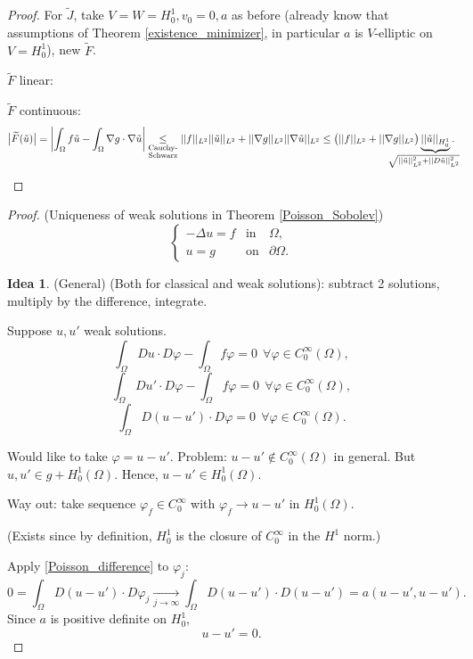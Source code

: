 \documentclass[12pt]{article}
\theoremstyle{definition}
\newtheorem*{idea}{Idea}
\begin{document}
\begin{proof}
For $\widetilde{J}$, take $V=W=H_0^1,v_0=0,a$ as before (already know that assumptions of Theorem \ref{existence_minimizer}, in particular $a$ is $V$-elliptic on $V=H_0^1$), new $\widetilde{F}$.

$\widetilde{F}$ linear: \checkmark

$\widetilde{F}$ continuous:
\[\big|\widetilde{F}(\tilde{u})\big|=\left|\int_{\Omega}f\tilde{u}-\int_{\Omega}\nabla g\cdot\nabla\tilde{u}\right|\underset{\substack{\text{Cauchy-}\\\text{Schwarz}}}{\leq}||f||_{L^2}||\tilde{u}||_{L^2}+||\nabla g||_{L^2}||\nabla\tilde{u}||_{L^2}\leq\big(||f||_{L^2}+||\nabla g||_{L^2}\big)\underbrace{||\tilde{u}||_{H_0^1}}_{\mathclap{\sqrt{||\tilde{u}||_{L^2}^2+||D\tilde{u}||_{L^2}^2}\hspace{8mm}}}.\]
\end{proof}

\begin{proof}
(Uniqueness of weak solutions in Theorem \ref{Poisson_Sobolev})
\[\left\{\begin{array}{rcl}-\Delta u=f&\text{in}&\Omega,\\u=g&\text{on}&\partial\Omega.\end{array}\right.\]

\begin{idea}
(General) (Both for classical and weak solutions): subtract 2 solutions, multiply by the difference, integrate.
\end{idea}

Suppose $u,u'$ weak solutions.
\[\int_{\Omega}Du\cdot D\varphi-\int_{\Omega}f\varphi=0\ \ \forall\varphi\in C_0^{\infty}(\Omega),\]
\[\int_{\Omega}Du'\cdot D\varphi-\int_{\Omega}f\varphi=0\ \ \forall\varphi\in C_0^{\infty}(\Omega),\]
\begin{equation}\tag{$*$}\label{Poisson_difference}
\int_{\Omega}D(u-u')\cdot D\varphi=0\ \ \forall\varphi\in C_0^{\infty}(\Omega).
\end{equation}

Would like to take $\varphi=u-u'$. Problem: $u-u'\notin C_0^{\infty}(\Omega)$ in general. But $u,u'\in g+H_0^1(\Omega)$. Hence, $u-u'\in H_0^1(\Omega)$.

Way out: take sequence $\varphi_f\in C_0^{\infty}$ with $\varphi_f\rightarrow u-u'$ in $H_0^1(\Omega)$.

(Exists since by definition, $H_0^1$ is the closure of $C_0^{\infty}$ in the $H^1$ norm.)

Apply \eqref{Poisson_difference} to $\varphi_j$:
\[0=\int_{\Omega}D(u-u')\cdot D\varphi_j\xrightarrow[j\to\infty]{}\int_{\Omega}D(u-u')\cdot D(u-u')=a(u-u',u-u').\]
Since $a$ is positive definite on $H_0^1$,
\[u-u'=0.\]
\end{proof}
\end{document}
